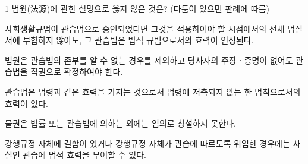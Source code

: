 \begin{question}{1}
법원(法源)에 관한 설명으로 옳지 않은 것은? (다툼이 있으면 판례에 따름)
\begin{choices}
  \item 사회생활규범이 관습법으로 승인되었다면 그것을 적용하여야 할 시점에서의 전체 법질서에 부합하지 않아도, 그 관습법은 법적 규범으로서의 효력이 인정된다.
  \item 법원은 관습법의 존부를 알 수 없는 경우를 제외하고 당사자의 주장ㆍ증명이 없어도 관습법을 직권으로 확정하여야 한다.
  \item 관습법은 법령과 같은 효력을 가지는 것으로서 법령에 저촉되지 않는 한 법칙으로서의 효력이 있다.
  \item 물권은 법률 또는 관습법에 의하는 외에는 임의로 창설하지 못한다.
  \item 강행규정 자체에 결함이 있거나 강행규정 자체가 관습에 따르도록 위임한 경우에는 사실인 관습에 법적 효력을 부여할 수 있다.
\end{choices}
\end{question}
